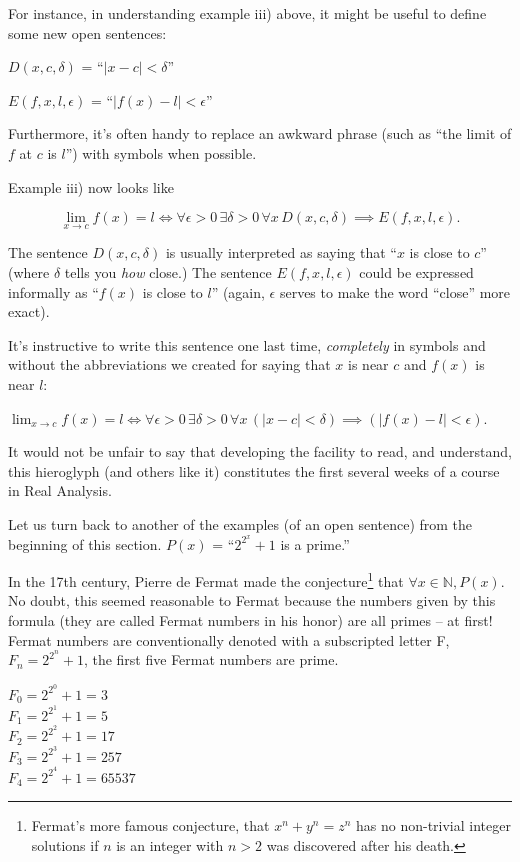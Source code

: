 For instance, in understanding example iii) above, it might be
useful to define some new open sentences:

$D(x,c,\delta)$ = ``$|x-c| < \delta$''

$E(f,x,l,\epsilon)$ = ``$|f(x)-l| < \epsilon$''

\noindent Furthermore, it's often handy to replace an awkward phrase (such as 
``the limit of $f$ at $c$ is $l$'') with symbols when possible.
 
Example iii) now looks like 

\[ \lim_{x\rightarrow c}f(x) = l \iff \forall \epsilon>0 \, \exists \delta>0 \, \forall x \, D(x,c,\delta) \implies E(f,x,l,\epsilon). \]

The sentence $D(x,c,\delta)$ is usually interpreted as saying that
``$x$ is close to $c$'' (where $\delta$ tells you {\em how} close.)
The sentence $E(f,x,l,\epsilon)$ could be expressed informally as
``$f(x)$ is close to $l$'' (again, $\epsilon$ serves to make the 
word ``close'' more exact).

It's instructive to write this sentence one last time, {\em completely}
in symbols and without the abbreviations we created for saying
that $x$ is near $c$ and $f(x)$ is near $l$:


$\displaystyle \lim_{x\rightarrow c}f(x) = l \iff \forall \epsilon>0 \, \exists 
\delta>0 \, \forall x \, (|x-c| < \delta) \implies (|f(x)-l| < \epsilon) $.

It would not be unfair to say that developing the facility to read,
and understand, this hieroglyph (and others like it) constitutes the 
first several weeks of a course in Real Analysis.

Let us turn back to another of the examples (of an open sentence) from the
beginning of this section.  $P(x)$ = ``$2^{2^x}+1$ is a prime.''

In the 17th century, Pierre de Fermat 
made the conjecture\footnote{Fermat's 
more famous conjecture, that $x^n+y^n=z^n$ has no non-trivial integer solutions
if $n$ is an integer with $n>2$ was discovered after his death.} that 
$\forall x \in {\mathbb N}, P(x)$.  No doubt, this seemed reasonable to Fermat
because the numbers given by this formula (they are called 
Fermat numbers in
his honor) are all primes -- at first!  Fermat numbers are conventionally
denoted with a subscripted letter F,  $F_n = 2^{2^n}+1$, the first five
Fermat numbers are prime.

\begin{center}
$\displaystyle F_0 = 2^{2^0}+1 = 3$\\
$\displaystyle F_1 = 2^{2^1}+1 = 5$\\
$\displaystyle F_2 = 2^{2^2}+1 = 17$\\
$\displaystyle F_3 = 2^{2^3}+1 = 257$\\
$\displaystyle F_4 = 2^{2^4}+1 = 65537$\\
\end{center}
 
